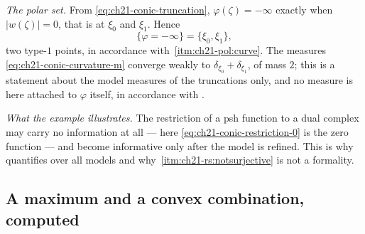 \begin{example}
\emph{The polar set.}  From \eqref{eq:ch21-conic-truncation},
$\varphi(\zeta)=-\infty$ exactly when $|w(\zeta)|=0$, that is at
$\xi_0$ and $\xi_1$.  Hence
\[
 \{\varphi=-\infty\}=\{\xi_0,\xi_1\},
\]
two type-$1$ points, in accordance with
\,\cref{itm:ch21-pol:curve}.  The measures
\eqref{eq:ch21-conic-curvature-m} converge weakly to
$\delta_{\xi_0}+\delta_{\xi_1}$, of mass $2$; this is a statement about
the model measures of the truncations only, and no measure is here attached
to $\varphi$ itself, in accordance with .

\emph{What the example illustrates.}  The restriction of a psh function to
a dual complex may carry no information at all --- here
\eqref{eq:ch21-conic-restriction-0} is the zero function --- and become
informative only after the model is refined.  This is why
 quantifies over all models and why
\,\cref{itm:ch21-rs:notsurjective} is not
a formality.
\end{example}

\subsection{A maximum and a convex combination, computed}
\label{sec:ch21-worked-max}

